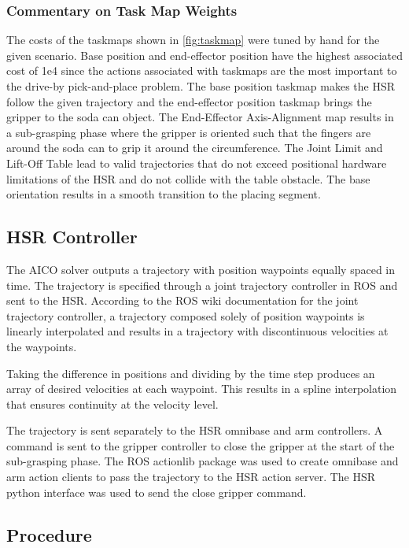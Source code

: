 \documentclass[11pt]{article}
\begin{document}
            \subsubsection{Commentary on Task Map Weights}
                The costs of the taskmaps shown in \cref{fig:taskmap} were tuned by hand for the given scenario. Base position and end-effector position have the highest associated cost of 1e4 since the actions associated with taskmaps are the most important to the drive-by pick-and-place problem. The base position taskmap makes the HSR follow the given trajectory and the end-effector position taskmap brings the gripper to the soda can object. The End-Effector Axis-Alignment map results in a sub-grasping phase where the gripper is oriented such that the fingers are around the soda can to grip it around the circumference. The Joint Limit and Lift-Off Table lead to valid trajectories that do not exceed positional hardware limitations of the HSR and do not collide with the table obstacle. The base orientation results in a smooth transition to the placing segment.
        \subsection{HSR Controller}
            The AICO solver outputs a trajectory with position waypoints equally spaced in time. The trajectory is specified through a joint trajectory controller in ROS and sent to the HSR. According to the ROS wiki documentation for the joint trajectory controller, a trajectory composed solely of position waypoints is linearly interpolated and results in a trajectory with discontinuous velocities at the waypoints. 
            \par Taking the difference in positions and dividing by the time step produces an array of desired velocities at each waypoint. This results in a spline interpolation that ensures continuity at the velocity level. 

            \par The trajectory is sent separately to the HSR omnibase and arm controllers. A command is sent to the gripper controller to close the gripper at the start of the sub-grasping phase. The ROS actionlib package was used to create omnibase and arm action clients to pass the trajectory to the HSR action server. The HSR python interface was used to send the close gripper command.

        \subsection{Procedure}
\end{document}
